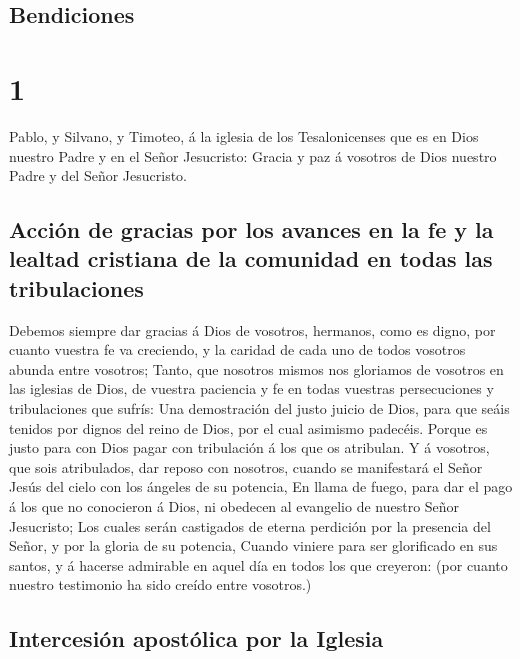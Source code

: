 \hypertarget{bendiciones}{%
\subsection{Bendiciones}\label{bendiciones}}

\hypertarget{section}{%
\section{1}\label{section}}

 Pablo, y Silvano, y Timoteo, á la iglesia de los
Tesalonicenses que es en Dios nuestro Padre y en el Señor Jesucristo:
 Gracia y paz á vosotros de Dios nuestro Padre y del Señor
Jesucristo.

\hypertarget{acciuxf3n-de-gracias-por-los-avances-en-la-fe-y-la-lealtad-cristiana-de-la-comunidad-en-todas-las-tribulaciones}{%
\subsection{Acción de gracias por los avances en la fe y la lealtad
cristiana de la comunidad en todas las
tribulaciones}\label{acciuxf3n-de-gracias-por-los-avances-en-la-fe-y-la-lealtad-cristiana-de-la-comunidad-en-todas-las-tribulaciones}}

 Debemos siempre dar gracias á Dios de vosotros, hermanos,
como es digno, por cuanto vuestra fe va creciendo, y la caridad de cada
uno de todos vosotros abunda entre vosotros;  Tanto, que
nosotros mismos nos gloriamos de vosotros en las iglesias de Dios, de
vuestra paciencia y fe en todas vuestras persecuciones y tribulaciones
que sufrís:  Una demostración del justo juicio de Dios, para
que seáis tenidos por dignos del reino de Dios, por el cual asimismo
padecéis.  Porque es justo para con Dios pagar con
tribulación á los que os atribulan.  Y á vosotros, que sois
atribulados, dar reposo con nosotros, cuando se manifestará el Señor
Jesús del cielo con los ángeles de su potencia,  En llama de
fuego, para dar el pago á los que no conocieron á Dios, ni obedecen al
evangelio de nuestro Señor Jesucristo;  Los cuales serán
castigados de eterna perdición por la presencia del Señor, y por la
gloria de su potencia,  Cuando viniere para ser glorificado
en sus santos, y á hacerse admirable en aquel día en todos los que
creyeron: (por cuanto nuestro testimonio ha sido creído entre vosotros.)

\hypertarget{intercesiuxf3n-apostuxf3lica-por-la-iglesia}{%
\subsection{Intercesión apostólica por la
Iglesia}\label{intercesiuxf3n-apostuxf3lica-por-la-iglesia}}

